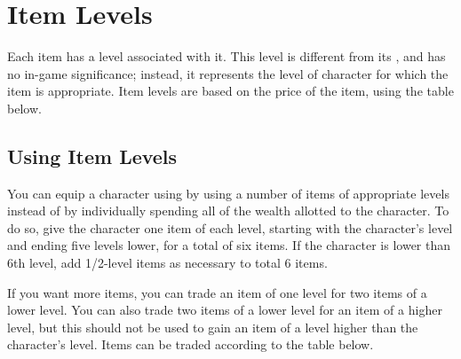 \section{Item Levels}

Each item has a level associated with it. This level is different from its , and has no in-game significance; instead, it represents the level of character for which the item is appropriate. Item levels are based on the price of the item, using the table below.

\subsection{Using Item Levels}

You can equip a character using by using a number of items of appropriate levels instead of by individually spending all of the wealth allotted to the character. To do so, give the character one item of each level, starting with the character's level and ending five levels lower, for a total of six items. If the character is lower than 6th level, add 1/2-level items as necessary to total 6 items.

If you want more items, you can trade an item of one level for two items of a lower level. You can also trade two items of a lower level for an item of a higher level, but this should not be used to gain an item of a level higher than the character's level. Items can be traded according to the table below.

